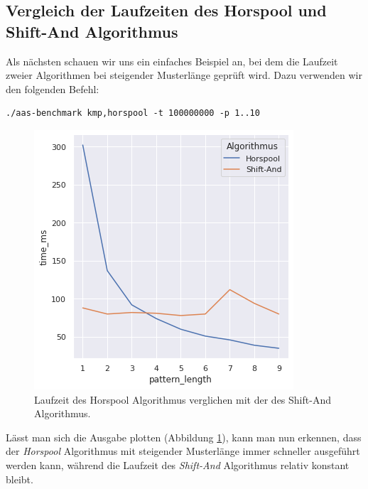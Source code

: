 \documentclass[twocolumn]{article}
\begin{document}
\subsection*{Vergleich der Laufzeiten des Horspool und Shift-And Algorithmus}

Als nächsten schauen wir uns ein einfaches Beispiel an, bei dem die Laufzeit zweier Algorithmen bei steigender Musterlänge geprüft wird. Dazu verwenden wir den folgenden Befehl:

\begin{lstlisting}[breaklines=true,autogobble=true]
    ./aas-benchmark kmp,horspool -t 100000000 -p 1..10
\end{lstlisting}

\begin{figure}
    \includegraphics[width=\linewidth]{assets/graph_2.png}
    \caption{Laufzeit des Horspool Algorithmus verglichen mit der des Shift-And Algorithmus.}
    \label{fig:runtime_horspool_shift_and}
\end{figure}

Lässt man sich die Ausgabe plotten (Abbildung \ref{fig:runtime_horspool_shift_and}), kann man nun erkennen, dass der \textit{Horspool} Algorithmus mit steigender Musterlänge immer schneller ausgeführt werden kann, während die Laufzeit des \textit{Shift-And} Algorithmus relativ konstant bleibt.
\end{document}
